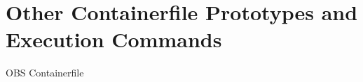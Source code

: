 \documentclass[journal,onecolumn]{IEEEtran}
\begin{document}










%


\appendices
\section{Other Containerfile Prototypes and Execution Commands}
OBS Containerfile
\end{document}
